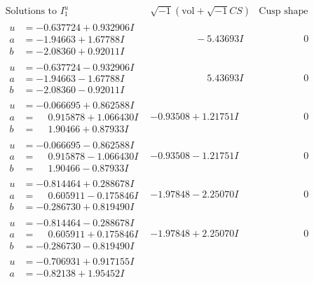 \documentclass[1p]{elsarticle_modified}
\theoremstyle{definition}
\newcommand{\I}{\sqrt{-1}}
\begin{document}
$$\begin{array}{c|c|c}
\text{Solutions to }I^u_{1}& \I (\text{vol} + \sqrt{-1}CS) & \text{Cusp shape}\\
 \hline 
\begin{aligned}
u &= -0.637724 + 0.932906 I \\
a &= -1.94663 + 1.67788 I \\
b &= -2.08360 + 0.92011 I\end{aligned}
 & \phantom{-0.000000 } -5.43693 I & \phantom{-0.000000 } 0 \\ \hline\begin{aligned}
u &= -0.637724 - 0.932906 I \\
a &= -1.94663 - 1.67788 I \\
b &= -2.08360 - 0.92011 I\end{aligned}
 & \phantom{-0.000000 -}5.43693 I & \phantom{-0.000000 } 0 \\ \hline\begin{aligned}
u &= -0.066695 + 0.862588 I \\
a &= \phantom{-}0.915878 + 1.066430 I \\
b &= \phantom{-}1.90466 + 0.87933 I\end{aligned}
 & -0.93508 + 1.21751 I & \phantom{-0.000000 } 0 \\ \hline\begin{aligned}
u &= -0.066695 - 0.862588 I \\
a &= \phantom{-}0.915878 - 1.066430 I \\
b &= \phantom{-}1.90466 - 0.87933 I\end{aligned}
 & -0.93508 - 1.21751 I & \phantom{-0.000000 } 0 \\ \hline\begin{aligned}
u &= -0.814464 + 0.288678 I \\
a &= \phantom{-}0.605911 - 0.175846 I \\
b &= -0.286730 + 0.819490 I\end{aligned}
 & -1.97848 - 2.25070 I & \phantom{-0.000000 } 0 \\ \hline\begin{aligned}
u &= -0.814464 - 0.288678 I \\
a &= \phantom{-}0.605911 + 0.175846 I \\
b &= -0.286730 - 0.819490 I\end{aligned}
 & -1.97848 + 2.25070 I & \phantom{-0.000000 } 0 \\ \hline\begin{aligned}
u &= -0.706931 + 0.917155 I \\
a &= -0.82138 + 1.95452 I \\

\end{aligned}
\end{array}$$
\end{document}
